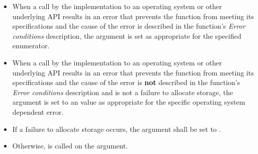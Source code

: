 \begin{itemize}
\item When a call by the implementation to an operating system or other underlying API results in an error that prevents the function from meeting its specifications and the cause of the error is described in the function's \textit{Error conditions} description, the  argument is set as appropriate for the specified enumerator.

\item When a call by the implementation to an operating system or other underlying API results in an error that prevents the function from meeting its specifications and the cause of the error is \textbf{not} described in the function's \textit{Error conditions} description and is not a failure to allocate storage, the  argument is set to an \impdef value as appropriate for the specific operating system dependent error.

\item If a failure to allocate storage occurs, the  argument shall be set to .

\item Otherwise,  is called on the  argument.
\end{itemize}
